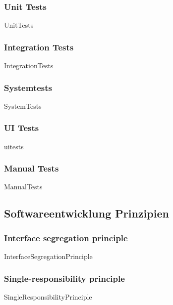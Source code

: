 \documentclass{article}
\begin{document}
        \subsubsection{Unit Tests}
            {UnitTests}
        
        \subsubsection{Integration Tests}
            {IntegrationTests}

        \subsubsection{Systemtests}
            {SystemTests}

        \subsubsection{UI Tests}
            {uitests}

        \newpage
        \subsubsection{Manual Tests}
            {ManualTests}
    \newpage
    \subsection{Softwareentwicklung Prinzipien}

        \subsubsection{Interface segregation principle}
        \label{kap:ISP}
            {InterfaceSegregationPrinciple}

        \newpage
        \subsubsection{Single-responsibility principle}
        \label{kap:SRP}
            {SingleResponsibilityPrinciple}
            
\end{document}
